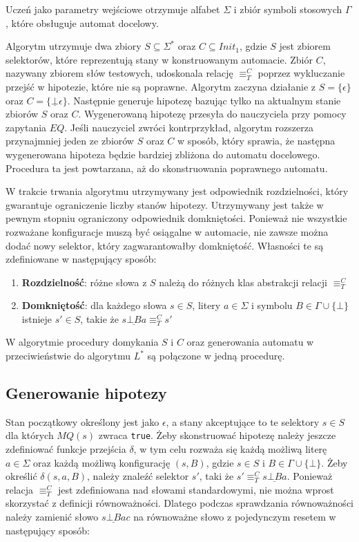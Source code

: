 Uczeń jako parametry wejściowe otrzymuje alfabet $\Sigma$ i zbiór symboli stosowych $\Gamma$, które obsługuje automat docelowy.

Algorytm utrzymuje dwa zbiory $S \subseteq \Sigma^*$ oraz $C \subseteq Init_1$, gdzie $S$ jest zbiorem selektorów,
które reprezentują stany w konstruowanym automacie. Zbiór $C$, nazywany zbiorem słów testowych, udoskonala relację $\equiv^{C}_T$ poprzez
wykluczanie przejść w hipotezie, które nie są poprawne. Algorytm zaczyna działanie z $S = \{\epsilon\}$ oraz $C = \{ \underline{\bot}\epsilon\}$.
Następnie generuje hipotezę bazując tylko na aktualnym stanie zbiorów $S$ oraz $C$. Wygenerowaną hipotezę przesyła do nauczyciela przy pomocy
zapytania $EQ$. Jeśli nauczyciel zwróci kontrprzykład, algorytm rozszerza przynajmniej jeden ze zbiorów $S$ oraz $C$
w sposób, który sprawia, że następna wygenerowana hipoteza będzie bardziej zbliżona do automatu docelowego.
Procedura ta jest powtarzana, aż do skonstruowania poprawnego automatu.

W trakcie trwania algorytmu utrzymywany jest odpowiednik rozdzielności, który gwarantuje ograniczenie liczby stanów hipotezy.
Utrzymywany jest także w pewnym stopniu ograniczony odpowiednik domkniętości. Ponieważ nie wszystkie rozważane konfiguracje muszą być osiągalne
w automacie, nie zawsze można dodać nowy selektor, który zagwarantowałby domkniętość. Własności te są zdefiniowane w następujący sposób:

\begin{enumerate}
    \item \textbf{Rozdzielność}: różne słowa z $S$ należą do różnych klas abstrakcji relacji $\equiv^C_T$

    \item \textbf{Domkniętość}: dla każdego słowa $s \in S$, litery $a \in \Sigma$ i symbolu $B \in \Gamma \cup \{\bot\}$ istnieje
    $s' \in S$, takie że $s\underline{\bot B}a \equiv^C_T s'$
\end{enumerate}

W algorytmie procedury domykania $S$ i $C$ oraz generowania automatu w przeciwieństwie do algorytmu $L^*$ są połączone w jedną procedurę.

\subsection{Generowanie hipotezy}

Stan początkowy określony jest jako $\epsilon$, a stany akceptujące to te selektory $s \in S$ dla których $MQ(s)$ zwraca \texttt{true}.
Żeby skonstruować hipotezę należy jeszcze zdefiniować funkcje przejścia $\delta$, w tym celu rozważa się każdą możliwą literę $a \in \Sigma$
oraz każdą możliwą konfigurację $(s, B)$, gdzie $s \in S$ i $B \in \Gamma \cup \{\bot\}$. Żeby określić $\delta(s, a, B)$, należy znaleźć selektor $s'$,
taki że $s' \equiv^C_T s\underline{\bot B}a$. Ponieważ relacja $\equiv^C_T$ jest zdefiniowana nad słowami standardowymi,
nie można wprost skorzystać z definicji równoważności.
Dlatego podczas sprawdzania równoważności należy zamienić słowo $s\underline{\bot B}ac$
na równoważne słowo z pojedynczym resetem w następujący sposób:

